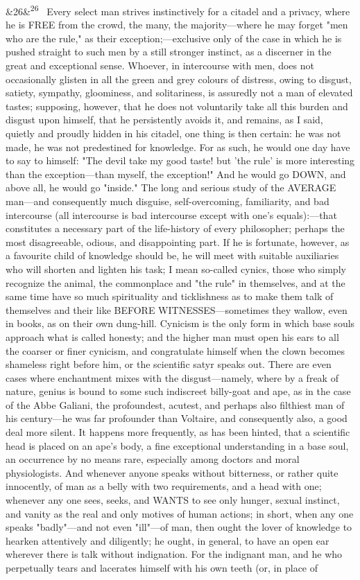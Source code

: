 \documentclass[12pt]{article}
\newcommand{\para}[1][]{\par\noindent\ifx&#1&\else\textsuperscript{\footnotesize #1}~\fi}
\begin{document}
\para[26] Every select man strives instinctively for a citadel and a privacy, where he is FREE from the crowd, the many, the majority---where he may forget "men who are the rule," as their exception;---exclusive only of the case in which he is pushed straight to such men by a still stronger instinct, as a discerner in the great and exceptional sense. Whoever, in intercourse with men, does not occasionally glisten in all the green and grey colours of distress, owing to disgust, satiety, sympathy, gloominess, and solitariness, is assuredly not a man of elevated tastes; supposing, however, that he does not voluntarily take all this burden and disgust upon himself, that he persistently avoids it, and remains, as I said, quietly and proudly hidden in his citadel, one thing is then certain: he was not made, he was not predestined for knowledge. For as such, he would one day have to say to himself: "The devil take my good taste! but 'the rule' is more interesting than the exception---than myself, the exception!" And he would go DOWN, and above all, he would go "inside." The long and serious study of the AVERAGE man---and consequently much disguise, self-overcoming, familiarity, and bad intercourse (all intercourse is bad intercourse except with one's equals):---that constitutes a necessary part of the life-history of every philosopher; perhaps the most disagreeable, odious, and disappointing part. If he is fortunate, however, as a favourite child of knowledge should be, he will meet with suitable auxiliaries who will shorten and lighten his task; I mean so-called cynics, those who simply recognize the animal, the commonplace and "the rule" in themselves, and at the same time have so much spirituality and ticklishness as to make them talk of themselves and their like BEFORE WITNESSES---sometimes they wallow, even in books, as on their own dung-hill. Cynicism is the only form in which base souls approach what is called honesty; and the higher man must open his ears to all the coarser or finer cynicism, and congratulate himself when the clown becomes shameless right before him, or the scientific satyr speaks out. There are even cases where enchantment mixes with the disgust---namely, where by a freak of nature, genius is bound to some such indiscreet billy-goat and ape, as in the case of the Abbe Galiani, the profoundest, acutest, and perhaps also filthiest man of his century---he was far profounder than Voltaire, and consequently also, a good deal more silent. It happens more frequently, as has been hinted, that a scientific head is placed on an ape's body, a fine exceptional understanding in a base soul, an occurrence by no means rare, especially among doctors and moral physiologists. And whenever anyone speaks without bitterness, or rather quite innocently, of man as a belly with two requirements, and a head with one; whenever any one sees, seeks, and WANTS to see only hunger, sexual instinct, and vanity as the real and only motives of human actions; in short, when any one speaks "badly"---and not even "ill"---of man, then ought the lover of knowledge to hearken attentively and diligently; he ought, in general, to have an open ear wherever there is talk without indignation. For the indignant man, and he who perpetually tears and lacerates himself with his own teeth (or, in place of 
\end{document}
